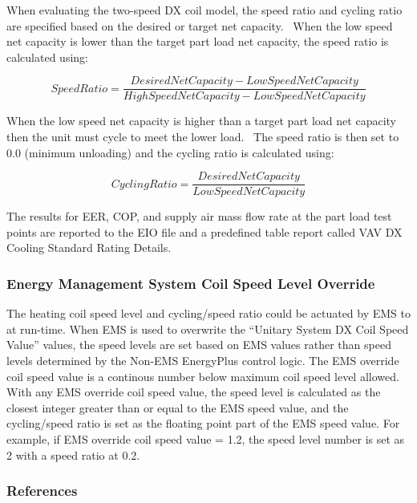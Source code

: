 When evaluating the two-speed DX coil model, the speed ratio and cycling ratio are specified based on the desired or target net capacity.~ When the low speed net capacity is lower than the target part load net capacity, the speed ratio is calculated using:

\begin{equation}
SpeedRatio = \frac{{DesiredNetCapacity - LowSpeedNetCapacity}}{{HighSpeedNetCapacity - LowSpeedNetCapacity}}
\end{equation}

When the low speed net capacity is higher than a target part load net capacity then the unit must cycle to meet the lower load.~ The speed ratio is then set to 0.0 (minimum unloading) and the cycling ratio is calculated using:

\begin{equation}
CyclingRatio = \frac{{DesiredNetCapacity}}{{LowSpeedNetCapacity}}
\end{equation}

The results for EER, COP, and supply air mass flow rate at the part load test points are reported to the EIO file and a predefined table report called VAV DX Cooling Standard Rating Details.

\subsubsection{Energy Management System Coil Speed Level Override}\label{energy-management-system-coil-speed-level-override-2}

The heating coil speed level and cycling/speed ratio could be actuated by EMS to at run-time. When EMS is used to overwrite the “Unitary System DX Coil Speed Value” values, the speed levels are set based on EMS values rather than speed levels determined by the Non-EMS EnergyPlus control logic. The EMS override coil speed value is a continous number below maximum coil speed level allowed. With any EMS override coil speed value, the speed level is calculated as the closest integer greater than or equal to the EMS speed value, and the cycling/speed ratio is set as the floating point part of the EMS speed value. For example, if EMS override coil speed value = 1.2, the speed level number is set as 2 with a speed ratio at 0.2.

\subsubsection{References}\label{references-4-001}

